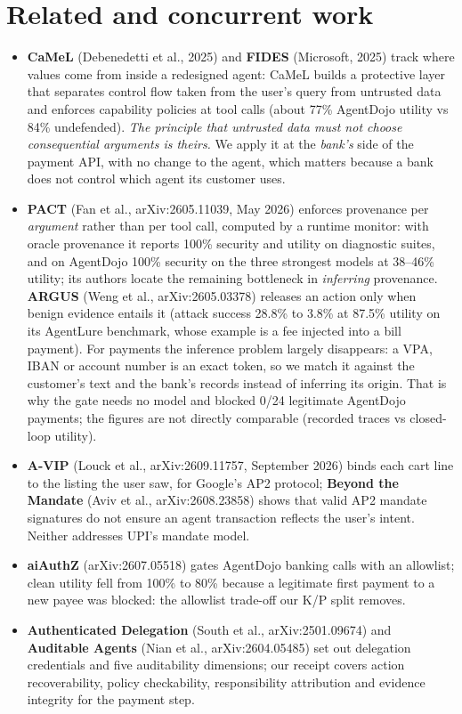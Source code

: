 \documentclass[10pt,a4paper]{article}
\begin{document}
\section{Related and concurrent work}

\begin{itemize}
\item \textbf{CaMeL} (Debenedetti et al., 2025) and \textbf{FIDES} (Microsoft, 2025) track where values come from inside a
redesigned agent: CaMeL builds a protective layer that separates control flow taken from the user's query from untrusted
data and enforces capability policies at tool calls (about 77\% AgentDojo utility vs 84\% undefended). \emph{The principle
that untrusted data must not choose consequential arguments is theirs.} We apply it at the \emph{bank's} side of the payment
API, with no change to the agent, which matters because a bank does not control which agent its customer uses.
\item \textbf{PACT} (Fan et al., arXiv:2605.11039, May 2026) enforces provenance per \emph{argument} rather than per tool
call, computed by a runtime monitor: with oracle provenance it reports 100\% security and utility on diagnostic suites, and
on AgentDojo 100\% security on the three strongest models at 38--46\% utility; its authors locate the remaining bottleneck in
\emph{inferring} provenance. \textbf{ARGUS} (Weng et al., arXiv:2605.03378) releases an action only when benign evidence
entails it (attack success 28.8\% to 3.8\% at 87.5\% utility on its AgentLure benchmark, whose example is a fee injected into
a bill payment). For payments the inference problem largely disappears: a VPA, IBAN or account number is an exact token, so
we match it against the customer's text and the bank's records instead of inferring its origin. That is why the gate needs
no model and blocked 0/24 legitimate AgentDojo payments; the figures are not directly comparable (recorded traces vs
closed-loop utility).
\item \textbf{A-VIP} (Louck et al., arXiv:2609.11757, September 2026) binds each cart line to the listing the user saw, for
Google's AP2 protocol; \textbf{Beyond the Mandate} (Aviv et al., arXiv:2608.23858) shows that valid AP2 mandate signatures
do not ensure an agent transaction reflects the user's intent. Neither addresses UPI's mandate model.
\item \textbf{aiAuthZ} (arXiv:2607.05518) gates AgentDojo banking calls with an allowlist; clean utility fell from 100\%
to 80\% because a legitimate first payment to a new payee was blocked: the allowlist trade-off our K/P split removes.
\item \textbf{Authenticated Delegation} (South et al., arXiv:2501.09674) and \textbf{Auditable Agents} (Nian et al.,
arXiv:2604.05485) set out delegation credentials and five auditability dimensions; our receipt covers action recoverability,
policy checkability, responsibility attribution and evidence integrity for the payment step.
\end{itemize}
\end{document}
